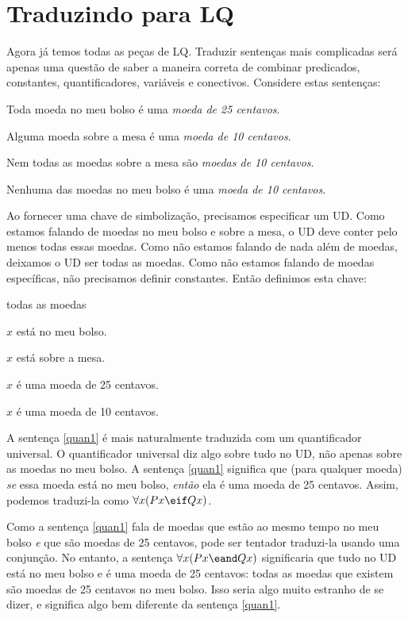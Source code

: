 \section{Traduzindo para LQ}
Agora já temos todas as peças de LQ. Traduzir sentenças mais complicadas será apenas uma questão de saber a maneira correta de combinar predicados, constantes, quantificadores, variáveis e conectivos. Considere estas sentenças:
\begin{earg}
\item[\ex{quan1}] Toda moeda no meu bolso é uma \emph{moeda de 25 centavos}.
\item[\ex{quan2}] Alguma moeda sobre a mesa é uma \emph{moeda de 10 centavos}.
\item[\ex{quan3}] Nem todas as moedas sobre a mesa são \emph{moedas de 10 centavos}.
\item[\ex{quan4}] Nenhuma das moedas no meu bolso é uma \emph{moeda de 10 centavos}.
\end{earg}
Ao fornecer uma chave de simbolização, precisamos especificar um UD. Como estamos falando de moedas no meu bolso e sobre a mesa, o UD deve conter pelo menos todas essas moedas. Como não estamos falando de nada além de moedas, deixamos o UD ser todas as moedas. Como não estamos falando de moedas específicas, não precisamos definir constantes. Então definimos esta chave:
\begin{ekey}
\item[UD:] todas as moedas
\item[Px:] $x$ está no meu bolso.
\item[Tx:] $x$ está sobre a mesa.
\item[Qx:] $x$ é uma moeda de 25 centavos.
\item[Dx:] $x$ é uma moeda de 10 centavos.
\end{ekey}
A sentença \ref{quan1} é mais naturalmente traduzida com um quantificador universal. O quantificador universal diz algo sobre tudo no UD, não apenas sobre as moedas no meu bolso. A sentença \ref{quan1} significa que (para qualquer moeda) \emph{se} essa moeda está no meu bolso, \emph{então} ela é uma moeda de 25 centavos. Assim, podemos traduzi-la como $\forall x(Px \eif Qx)$.

Como a sentença \ref{quan1} fala de moedas que estão ao mesmo tempo no meu bolso \emph{e} que são moedas de 25 centavos, pode ser tentador traduzi-la usando uma conjunção. No entanto, a sentença $\forall x(Px \eand Qx)$ significaria que tudo no UD está no meu bolso e é uma moeda de 25 centavos: todas as moedas que existem são moedas de 25 centavos no meu bolso. Isso seria algo muito estranho de se dizer, e significa algo bem diferente da sentença \ref{quan1}.

